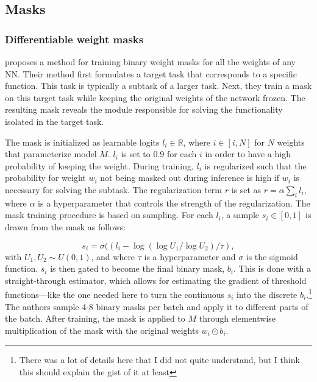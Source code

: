 \documentclass[11pt]{article}
\begin{document}
\subsection{Masks}
\subsubsection{Differentiable weight masks}
\citet{csordas2020neural} proposes a method for training binary weight masks for all the weights of any NN. Their method first formulates a target task that corresponds to a specific function. This task is typically a subtask of a larger task. Next, they train a mask on this target task while keeping the original weights of the network frozen. The resulting mask reveals the module responsible for solving the functionality isolated in the target task.

The mask is initialized as learnable logits $l_i \in \mathbb{R}$, where $i \in [i, N]$ for $N$ weights that parameterize model $M$. $l_i$ is set to $0.9$ for each $i$ in order to have a high probability of keeping the weight. During training, $l_i$ is regularized such that the probability for weight $w_i$ not being masked out during inference is high if $w_i$ is necessary for solving the subtask. The regularization term $r$ is set as $r = \alpha \sum_i l_i$, where $\alpha$ is a hyperparameter that controls the strength of the regularization. The mask training procedure is based on sampling. For each $l_i$, a sample $s_i \in [0, 1]$ is drawn from the mask as follows:

\begin{equation}
s_i = \sigma((l_i - \log(\log U_1 / \log U_2) / \tau),
\end{equation}
with $U_1, U_2 \sim U(0,1)$, and where $\tau$ is a hyperparameter and $\sigma$ is the sigmoid function. $s_i$ is then gated to become the final binary mask, $b_i$. This is done with a straight-through estimator, which allows for estimating the gradient of threshold functions---like the one needed here to turn the continuous $s_i$ into the discrete $b_i$.\footnote{There was a lot of details here that I did not quite understand, but I think this should explain the gist of it at least} The authors sample 4-8 binary masks per batch and apply it to different parts of the batch. After training, the mask is applied to $M$ through elementwise multiplication of the mask with the original weights $w_i \odot b_i$. 
\end{document}
